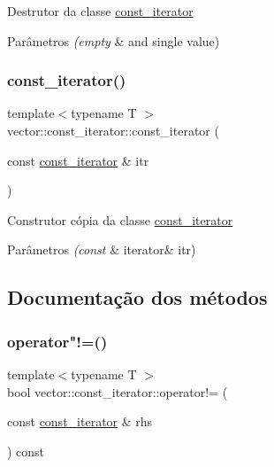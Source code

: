 Destrutor da classe \mbox{\hyperlink{classsc_1_1vector_1_1const__iterator}{const\+\_\+iterator}} 
\begin{DoxyParams}{Parâmetros}
{\em (empty} & and single value) \\
\hline
\end{DoxyParams}
\mbox{\label{classsc_1_1vector_1_1const__iterator_aa1d513fee7461529b1c2b704019caa38}} 
\subsubsection{\texorpdfstring{const\+\_\+iterator()}{const\_iterator()}\hspace{0.1cm}{\footnotesize\ttfamily [2/2]}}
{\footnotesize\ttfamily template$<$typename T $>$ \\
vector\+::const\+\_\+iterator\+::const\+\_\+iterator (\begin{DoxyParamCaption}\item[{const \mbox{\hyperlink{classsc_1_1vector_1_1const__iterator}{const\+\_\+iterator}} \&}]{itr }\end{DoxyParamCaption})}

Construtor cópia da classe \mbox{\hyperlink{classsc_1_1vector_1_1const__iterator}{const\+\_\+iterator}} 
\begin{DoxyParams}{Parâmetros}
{\em (const} & iterator\& itr) \\
\hline
\end{DoxyParams}


\subsection{Documentação dos métodos}
\mbox{\label{classsc_1_1vector_1_1const__iterator_af5fa6b6215c897703b800176381cbe35}} 
\subsubsection{\texorpdfstring{operator"!=()}{operator!=()}}
{\footnotesize\ttfamily template$<$typename T $>$ \\
bool vector\+::const\+\_\+iterator\+::operator!= (\begin{DoxyParamCaption}\item[{const \mbox{\hyperlink{classsc_1_1vector_1_1const__iterator}{const\+\_\+iterator}} \&}]{rhs }\end{DoxyParamCaption}) const}


